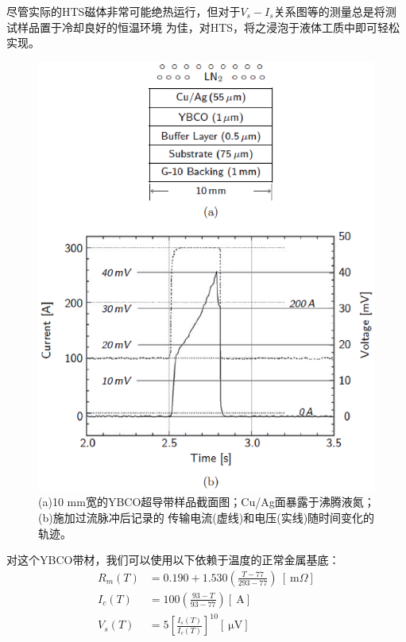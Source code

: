 尽管实际的HTS磁体非常可能绝热运行，但对于$V_s-I_s$关系图等的测量总是将测试样品置于冷却良好的恒温环境
为佳，对HTS，将之浸泡于液体工质中即可轻松实现。
\begin{figure}[htbp]
	\centering
	\includegraphics[scale=0.5]{chpt6/figs/fig6.12.eps}
	\caption{(a)10 mm宽的YBCO超导带样品截面图；Cu/Ag面暴露于沸腾液氮；(b)施加过流脉冲后记录的
		传输电流(虚线)和电压(实线)随时间变化的轨迹。}
\end{figure}

对这个YBCO带材，我们可以使用以下依赖于温度的正常金属基底：
\begin{subequations}
	\begin{align}
	R_m(T)&=0.190+1.530(\frac{T-77}{293-77})\ [\ \mathrm{m}\Omega]\\
	I_c(T)&=100(\frac{93-T}{93-77})[\ \mathrm{A}]\\
	V_s(T)&=5[\frac{I_s(T)}{I_c(T)}]^{10} [\ \mathrm{\mu V}]
	\end{align}
\end{subequations}

